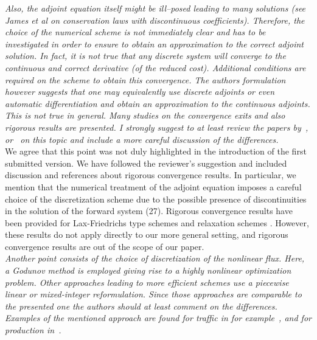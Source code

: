 \documentclass[10pt]{article}
\begin{document}
\emph{Also, the adjoint equation itself might be ill--posed leading to many solutions (see James et al
on conservation laws with discontinuous coefficients). Therefore, the choice of the numerical
scheme is not immediately clear and has to be investigated in order to ensure to obtain  an
approximation to the correct adjoint solution.
In fact, it is not true that any discrete system will converge to the continuous and correct derivative (of the reduced cost). Additional
conditions are required on the scheme to obtain this convergence. The authors formulation
however suggests that one may equivalently use discrete adjoints or even automatic
differentiation and obtain an approximation to the continuous adjoints. This
is not true in general.
Many studies on the convergence exits and also rigorous results are presented.
I strongly suggest to at least review the papers by~\cite{giles2010convergencepart1,giles2010convergencepart2},
or~\cite{Banda2012Adjoint} on this topic and include a more careful discussion of the differences.}\\


We agree that this point was not duly highlighted in the introduction of the first submitted version. We have followed the reviewer's suggestion and included discussion and references about rigorous convergence results. In particular, we mention that the numerical treatment of the adjoint equation imposes a careful choice of the discretization scheme due to 
the possible presence of discontinuities in the solution of the forward system (27). Rigorous convergence results have been provided for Lax-Friedrichs type schemes \cite{giles2010convergencepart2} and relaxation schemes \cite{Banda2012Adjoint}. However, these results 
do not apply directly to our more general setting, and rigorous convergence results are out of the scope of our paper.\\


\emph{Another point consists of the choice of discretization of the nonlinear flux. Here,
a Godunov method is employed giving rise to a highly nonlinear optimization
problem. Other approaches leading to more efficient  schemes use a piecewise
linear or mixed-integer reformulation. Since those approaches are comparable
to the presented one the authors should at least comment on the differences.
Examples of the mentioned approach are found for traffic in for example~\cite{fugenschuh2006combinatorial},
and for production in~\cite{d2010modeling}.}\\
\end{document}
